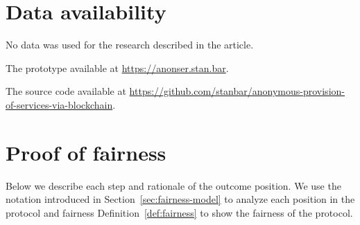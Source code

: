\section*{Data availability}
No data was used for the research described in the article.

The prototype available at \url{https://anonser.stan.bar}. 

The source code available at \url{https://github.com/stanbar/anonymous-provision-of-services-via-blockchain}.

\printbibliography
\appendix
\fi


\section{Proof of fairness}\label{app:proof-of-fairness}
Below we describe each step and rationale of the outcome position.
We use the notation introduced in Section~\ref{sec:fairness-model} to analyze each position in the protocol and fairness Definition~\ref{def:fairness} to show the fairness of the protocol.


\newcommand{\AgreeablePath}{Agreeable path:}
\newcommand{\DisputePath}{The \customer{} starts a dispute:}
\newcommand{\Fairness}{Fairness:}
\newcommand{\CustomerTurn}[0]{\expandafter\MakeUppercase \customer{} turn:}
\newcommand{\SPTurn}[0]{\sp{} turn:}

\newcommand{\CanFollowToOne}[2]{The #1 can follow the protocol to the non-disadvantaged position #2}
\newcommand{\CanDoNothing}[1]{The #1 can do nothing and always ends up in the non-disadvantaged position}
\newcommand{\CanDoAnything}[1]{The #1 can do anything and always ends up in the non-disadvantaged position}
\newcommand{\Pos}[4]{$\operatorname{\sigma_{#1, #2, #3} = #4}$}
\newcommand{\WinForTheSameReason}[1]{The #1 wins the dispute for the same reason}
\newcommand{\LoseForTheSameReason}[1]{The #1 loses the dispute for the same reason}
\newcommand{\ActedAbnormallyThen}[1]{The #1 acted abnormally, then:}
\newcommand{\CustomerPaidButDidntGetResult}{the customer ends up in a disadvantaged position as he paid in advance but didn't receive the result}
\newcommand{\SpReceivedThePayment}{the SP ends up in the advantaged position as she received the payment}


